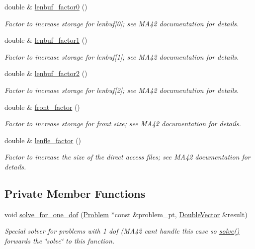\begin{DoxyCompactItemize}
double \& \hyperlink{classoomph_1_1HSL__MA42_add0eb83857efab7558a8d3b11c6d3ade}{lenbuf\+\_\+factor0} ()
\begin{DoxyCompactList}\small\item\em Factor to increase storage for lenbuf\mbox{[}0\mbox{]}; see M\+A42 documentation for details. \end{DoxyCompactList}\item 
double \& \hyperlink{classoomph_1_1HSL__MA42_a6223b48d49fe262c95e2766ed6f4d2cd}{lenbuf\+\_\+factor1} ()
\begin{DoxyCompactList}\small\item\em Factor to increase storage for lenbuf\mbox{[}1\mbox{]}; see M\+A42 documentation for details. \end{DoxyCompactList}\item 
double \& \hyperlink{classoomph_1_1HSL__MA42_af60a52ae246af72f38882bf77c324c13}{lenbuf\+\_\+factor2} ()
\begin{DoxyCompactList}\small\item\em Factor to increase storage for lenbuf\mbox{[}2\mbox{]}; see M\+A42 documentation for details. \end{DoxyCompactList}\item 
double \& \hyperlink{classoomph_1_1HSL__MA42_a15a7272fbf8ae4e75f781f90a768ee12}{front\+\_\+factor} ()
\begin{DoxyCompactList}\small\item\em Factor to increase storage for front size; see M\+A42 documentation for details. \end{DoxyCompactList}\item 
double \& \hyperlink{classoomph_1_1HSL__MA42_a2db42e5a60a0405753658132e8927fc0}{lenfle\+\_\+factor} ()
\begin{DoxyCompactList}\small\item\em Factor to increase the size of the direct access files; see M\+A42 documentation for details. \end{DoxyCompactList}\end{DoxyCompactItemize}
\subsection*{Private Member Functions}
\begin{DoxyCompactItemize}
\item 
void \hyperlink{classoomph_1_1HSL__MA42_a79fca4aba6935fc5376cd9fa33a05f6a}{solve\+\_\+for\+\_\+one\+\_\+dof} (\hyperlink{classoomph_1_1Problem}{Problem} $\ast$const \&problem\+\_\+pt, \hyperlink{classoomph_1_1DoubleVector}{Double\+Vector} \&result)
\begin{DoxyCompactList}\small\item\em Special solver for problems with 1 dof (M\+A42 can\textquotesingle{}t handle this case so \hyperlink{classoomph_1_1HSL__MA42_ae796a6b14c13d1cdb7bf49ca3c7c5aec}{solve()} forwards the \char`\"{}solve\char`\"{} to this function. \end{DoxyCompactList}\end{DoxyCompactItemize}
